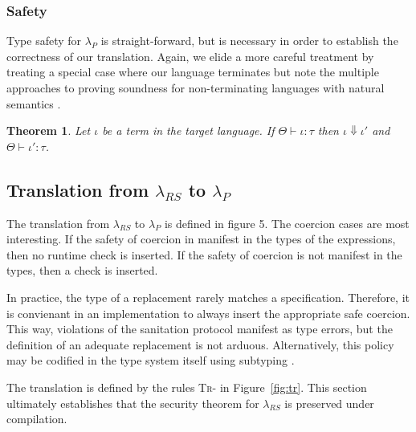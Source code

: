 \documentclass[9pt]{sig-alternate}
\newtheorem{thm}{Theorem}
\theoremstyle{definition}
\newcommand{\lambdas}{\lambda_{RS}}
\newcommand{\lambdap}{\lambda_P}
\newcommand{\tctx}{\Theta} %
\newcommand{\sreduces}{ \Downarrow }
\begin{document}
\subsubsection{Safety}

Type safety for $\lambdap$ is straight-forward, but is necessary in order to establish the 
correctness of our translation.
Again, we elide a more careful treatment by treating a special case where our language terminates but
note the multiple approaches to proving soundness for non-terminating languages with natural semantics \cite{coinductionoo, stepindexing, coinduction}.



\begin{thm} 
  Let $\iota$ be a term in the target language. If $\tctx \vdash \iota : \tau$ 
  then $\iota \sreduces \iota'$ and $\tctx \vdash \iota' : \tau$.
\end{thm}

\subsection{Translation from $\lambdas$ to $\lambdap$}\label{sec:tr}


The translation from $\lambdas$ to $\lambdap$ is defined in figure 5.
The coercion cases are most interesting. If the safety of coercion in manifest in the
types of the expressions, then no runtime check is inserted.
If the safety of coercion is not manifest in the types, then a check is inserted.

In practice, the type of a replacement rarely matches a specification.
Therefore, it is convienant in an implementation to always insert the appropriate
safe coercion. This way, violations of the sanitation protocol manifest as type errors,
but the definition of an adequate replacement is not arduous.
Alternatively, this policy may 
be codified in the type system itself using subtyping \cite{fulton12}.

The translation is defined by the rules \textsc{Tr-} in Figure~\ref{fig:tr}.
This section ultimately establishes that the security theorem for $\lambdas$ is preserved under compilation.
\end{document}
